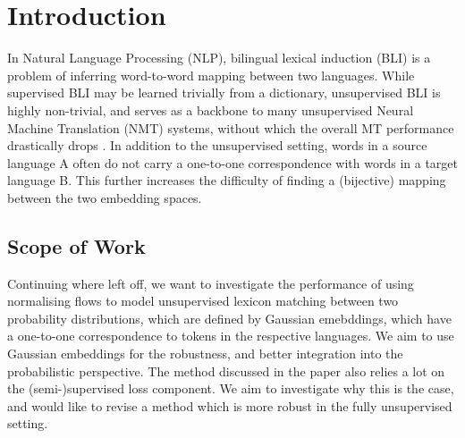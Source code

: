 \documentclass[a4paper,12pt,twoside,openright]{report}
\begin{document}
\pagestyle{empty}
\singlespacing

\onehalfspacing

\singlespacing


\setcounter{page}{0}
\pagestyle{plain}
\tableofcontents
\listoffigures
\listoftables

\onehalfspacing

\newcommand{\norm}[1]{\left\lVert#1\right\rVert}
\newcommand{\bracket}[1]{\left[#1\right]}
\newcommand{\absdet}[1]{\left|#1\right|}

\chapter{Introduction}
\setcounter{page}{1} 

In Natural Language Processing (NLP), bilingual lexical induction (BLI) is a problem of inferring word-to-word mapping between two languages.
While supervised BLI may be learned trivially from a dictionary, unsupervised BLI is highly non-trivial, and serves as a backbone to many unsupervised Neural Machine Translation (NMT) systems, without which the overall MT performance drastically drops \cite{dropping_perf1} \cite{dropping_perf2}.
In addition to the unsupervised setting, words in a source language A often do not carry a one-to-one correspondence with words in a target language B.
This further increases the difficulty of finding a (bijective) mapping between the two embedding spaces.

\section{Scope of Work}


Continuing where \cite{density_matching} left off, we want to investigate the performance of using normalising flows to model unsupervised lexicon matching between two probability distributions, which are defined by Gaussian emebddings, which have a one-to-one correspondence to tokens in the respective languages.
We aim to use Gaussian embeddings for the robustness, and better integration into the probabilistic perspective.
The method discussed in the paper also relies a lot on the (semi-)supervised loss component.
We aim to investigate why this is the case, and would like to revise a method which is more robust in the fully unsupervised setting.\\
\end{document}
